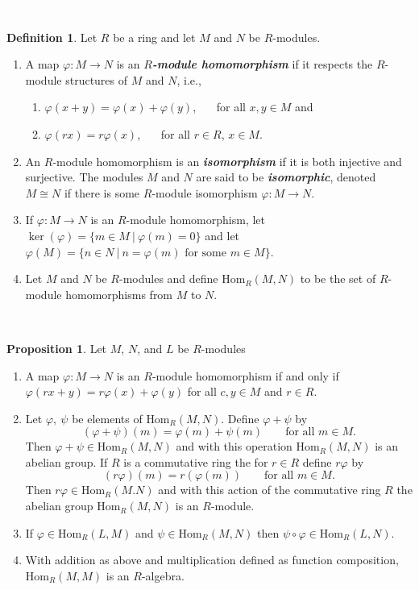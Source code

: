 \documentclass{article}
\theoremstyle{definition}
\newtheorem{prop}[thm]{Proposition}
\newtheorem{defn}[thm]{Definition}
\newcommand{\nl}{\textcolor{white}{nothing}}
\newcommand{\ra}{\rightarrow}
\newcommand{\vphi}{\varphi}
\newcommand{\Hom}{\text{Hom}}
\begin{document}
\nl

\begin{defn}
Let $R$ be a ring and let $M$ and $N$ be $R$-modules.
\begin{enumerate}
\item A map $\vphi: M\ra N$ is an $R$\textbf{\textit{-module homomorphism}} if it respects the $R$-module structures of $M$ and $N$, i.e.,
\begin{enumerate}
\item $\vphi(x + y) = \vphi(x) + \vphi(y)$, \ \ \ for all $x,y\in M$ and
\item $\vphi(rx) = r\vphi(x)$, \ \ \ for all $r\in R$, $x\in M$.
\end{enumerate}
\item An $R$-module homomorphism is an \textbf{\textit{isomorphism}} if it is both injective and surjective. The modules $M$ and $N$ are said to be \textbf{\textit{isomorphic}}, denoted $M\cong N$ if there is some $R$-module isomorphism $\vphi: M\ra N$.
\item If $\vphi:M\ra N$ is an $R$-module homomorphism, let $\ker(\vphi) = \{m\in M\ |\ \vphi(m) = 0\}$ and let $\vphi(M) = \{n\in N\ |\ n = \vphi(m)\text{ for some } m\in M\}$.
\item Let $M$ and $N$ be $R$-modules and define $\Hom_R(M,N)$ to be the set of $R$-module homomorphisms from $M$ to $N$.
\end{enumerate}
\end{defn}

\nl

\begin{prop}
Let $M$, $N$, and $L$ be $R$-modules
\begin{enumerate}
\item A map $\vphi: M\ra N$ is an $R$-module homomorphism if and only if $\vphi(rx + y) = r\vphi(x) + \vphi(y)$ for all $c,y\in M$ and $r\in R$.
\item Let $\vphi,\ \psi$ be elements of $\Hom_R(M,N)$. Define $\vphi + \psi $ by
\[(\vphi + \psi)(m) = \vphi(m) + \psi(m)\qquad\text{for all } m\in M.\]
Then $\vphi + \psi\in \Hom_R(M,N)$ and with this operation $\Hom_R(M,N)$ is an abelian group. If $R$ is a commutative ring the for $r\in R$ define $r\vphi$ by 
\[(r\vphi)(m) = r(\vphi(m))\qquad\text{for all } m\in M.\]
Then $r\vphi\in\Hom_R(M.N)$ and with this action of the commutative ring $R$ the abelian group $\Hom_R(M,N)$ is an $R$-module.
\item If $\vphi\in\Hom_R(L,M)$ and $\psi\in\Hom_R(M,N)$ then $\psi\circ\vphi\in\Hom_R(L,N)$.
\item With addition as above and multiplication defined as function composition, $\Hom_R(M,M)$ is an $R$-algebra.
\end{enumerate}
\end{prop}
\end{document}
